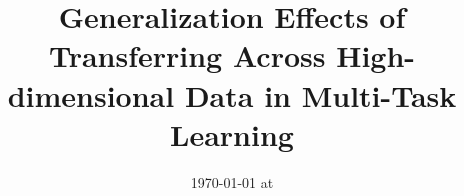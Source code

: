 \documentclass{article}
\begin{document}
\title{Generalization Effects of Transferring Across High-dimensional Data in Multi-Task Learning}
\date{}
\maketitle
\date{{\ddmmyyyydate\today} at \currenttime}




%

%





\newpage
\appendix



%
%

%

\end{document}
